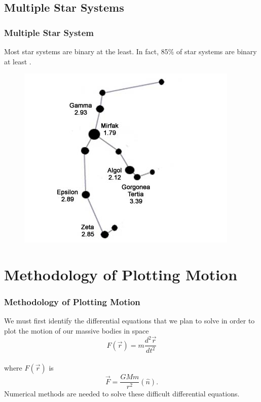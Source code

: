 \documentclass{beamer}
\begin{document}
\subsection{\tiny{Multiple Star Systems}}
\begin{frame}
\frametitle{Multiple Star System}
Most star systems are binary at the least. In fact, 85\% of star systems are binary at least \cite{CSIRO}.
\begin{figure}
\begin{center}
\includegraphics[width=0.70\linewidth]{Perseus.jpg}
\end{center}
\end{figure}
\end{frame}
\section{Methodology of Plotting Motion}
\begin{frame}
\frametitle{Methodology of Plotting Motion}
We must first identify the differential equations that we plan to solve in order to plot the motion of our massive bodies in space  \\
\begin{equation*}
F(\vec{r})=m\frac{d^2\vec{r}}{dt^2}
\end{equation*}\\
where $F(\vec{r})$ is
\begin{equation}\label{1}
\vec{F}=\frac{GMm}{r^2}(\hat{n}).
\end{equation}
Numerical methods are needed to solve these difficult differential equations.
\end{frame}
\end{document}
